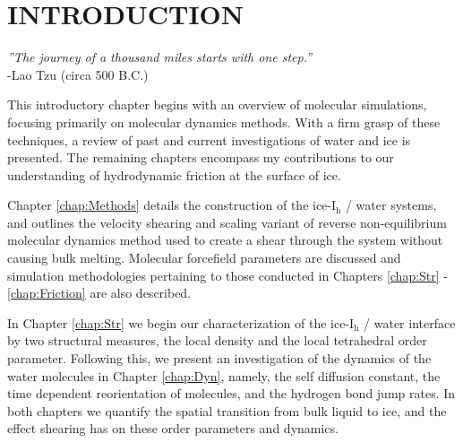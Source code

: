 \chapter{INTRODUCTION}\label{chap:intro}
%
%
%
%
%
%



\begin{flushright}
\textit{''The journey of a thousand miles starts with one step.''} \\
-Lao Tzu (circa 500 B.C.) \\
\end{flushright}

This introductory chapter begins with an overview of molecular
simulations, focusing primarily on molecular dynamics methods. With a
firm grasp of these techniques, a review of past and current
investigations of water and ice is presented. The remaining chapters
encompass my contributions to our understanding of hydrodynamic
friction at the surface of ice.

Chapter \ref{chap:Methods} details the construction of the
ice-I$_\mathrm{h}$ / water systems, and outlines the velocity shearing
and scaling variant of reverse non-equilibrium molecular dynamics
method used to create a shear through the system without causing bulk
melting. Molecular forcefield parameters are discussed and simulation
methodologies pertaining to those conducted in Chapters
\ref{chap:Str} - \ref{chap:Friction} are also described.

In Chapter \ref{chap:Str} we begin our characterization of the
ice-I$_\mathrm{h}$ / water interface by two structural measures, the
local density and the local tetrahedral order parameter. Following
this, we present an investigation of the dynamics of the water
molecules in Chapter \ref{chap:Dyn}, namely, the self diffusion
constant, the time dependent reorientation of molecules, and the
hydrogen bond jump rates. In both chapters we quantify the spatial
transition from bulk liquid to ice, and the effect shearing has
on these order parameters and dynamics.


